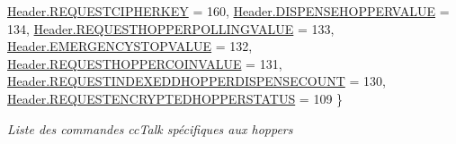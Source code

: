 \begin{DoxyCompactItemize}
\newline
\mbox{\hyperlink{group___header_ggab8e15517b29b9562c7d7e8616d61c855aaa3f8f4acd8572ce7e9f4fe87954b6c0}{Header.\+R\+E\+Q\+U\+E\+S\+T\+C\+I\+P\+H\+E\+R\+K\+EY}} = 160, 
\mbox{\hyperlink{group___header_ggab8e15517b29b9562c7d7e8616d61c855a3f0803c91adce917551e3653ce6ab02b}{Header.\+D\+I\+S\+P\+E\+N\+S\+E\+H\+O\+P\+P\+E\+R\+V\+A\+L\+UE}} = 134, 
\mbox{\hyperlink{group___header_ggab8e15517b29b9562c7d7e8616d61c855af4cf967e4b4c084bb9148099781b3a49}{Header.\+R\+E\+Q\+U\+E\+S\+T\+H\+O\+P\+P\+E\+R\+P\+O\+L\+L\+I\+N\+G\+V\+A\+L\+UE}} = 133, 
\mbox{\hyperlink{group___header_ggab8e15517b29b9562c7d7e8616d61c855ab7f6a886cf52347442b934ad59273c7d}{Header.\+E\+M\+E\+R\+G\+E\+N\+C\+Y\+S\+T\+O\+P\+V\+A\+L\+UE}} = 132, 
\newline
\mbox{\hyperlink{group___header_ggab8e15517b29b9562c7d7e8616d61c855a6ad8e7feb8e305d7b549b257c70d3ddf}{Header.\+R\+E\+Q\+U\+E\+S\+T\+H\+O\+P\+P\+E\+R\+C\+O\+I\+N\+V\+A\+L\+UE}} = 131, 
\mbox{\hyperlink{group___header_ggab8e15517b29b9562c7d7e8616d61c855a954b2d7e92fb3c676e4246f551a03871}{Header.\+R\+E\+Q\+U\+E\+S\+T\+I\+N\+D\+E\+X\+E\+D\+D\+H\+O\+P\+P\+E\+R\+D\+I\+S\+P\+E\+N\+S\+E\+C\+O\+U\+NT}} = 130, 
\mbox{\hyperlink{group___header_ggab8e15517b29b9562c7d7e8616d61c855aa0d004c8327a3e8b0ae5165246991c25}{Header.\+R\+E\+Q\+U\+E\+S\+T\+E\+N\+C\+R\+Y\+P\+T\+E\+D\+H\+O\+P\+P\+E\+R\+S\+T\+A\+T\+US}} = 109
 \}
\begin{DoxyCompactList}\small\item\em Liste des commandes cc\+Talk spécifiques aux hoppers \end{DoxyCompactList}\end{DoxyCompactItemize}
